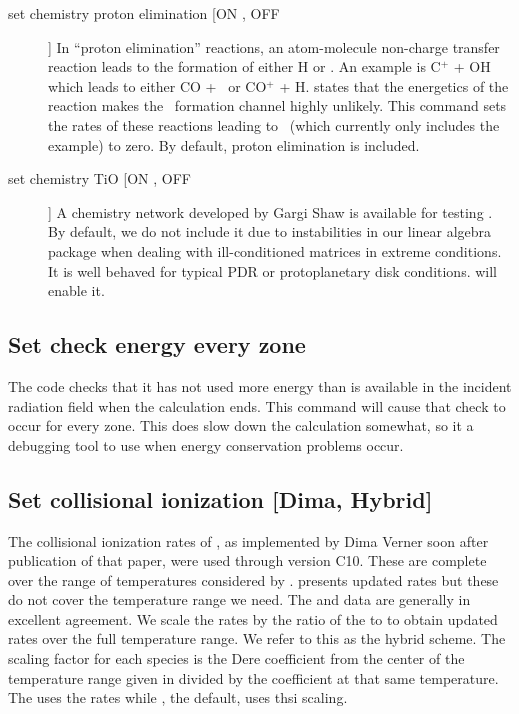\begin{description}
\item[set chemistry proton elimination  [ON , OFF]]  In ``proton elimination''
reactions, an atom-molecule non-charge transfer reaction leads to the
formation of either H or \hplus.
An example is C$^+$ + OH which leads to either
CO + \hplus\ or CO$^+$ + H.  \citet{Huntress1977} states that the energetics of the
reaction makes the \hplus\ formation channel highly unlikely.
This command sets
the rates of these reactions leading to \hplus\ (which currently only includes
the example) to zero.
By default, proton elimination is included.

\item[set chemistry TiO  [ON , OFF]]  A chemistry network 
developed by Gargi Shaw is available for testing
\citep{2024RMxAA..60..373S}. 
By default, we do not include it due to instabilities in our
linear algebra package when dealing with ill-conditioned matrices
in extreme conditions. It is well behaved for typical PDR or
protoplanetary disk conditions. 
 will enable it.

\end{description}

\subsection{Set check energy every zone}
The code checks that it has not used more energy than
is available in the incident radiation field when the calculation ends.
This command will cause that check to occur for every zone. 
This does slow down the calculation somewhat, so it a debugging
tool to use when energy conservation problems occur.

\subsection{Set collisional ionization [Dima, Hybrid]}
The collisional ionization rates of \citet{Voronov1997},
as implemented by Dima Verner soon after publication of that paper, 
were used through version C10.
These are complete over the range of temperatures considered by \Cloudy .
\citet{Dere.K07Ionization-rate-coefficients-for-the-elements} 
presents updated rates but these do not cover the temperature range we need.
The \citet{Voronov1997} and \citet{Dere.K07Ionization-rate-coefficients-for-the-elements} 
data are generally in excellent agreement.
We scale the \citet{Voronov1997} rates by the ratio of the 
\citet{Dere.K07Ionization-rate-coefficients-for-the-elements} to \citet{Voronov1997}
to obtain updated rates over the full temperature range.  
We refer to this as the hybrid scheme.
The scaling factor for each species is the Dere coefficient from the 
center of the temperature range given in 
\citet{Dere.K07Ionization-rate-coefficients-for-the-elements} 
divided by the 
\citet{Voronov1997} coefficient at that same temperature.
The  uses the \citet{Voronov1997} rates
while , the default, uses thsi scaling.

